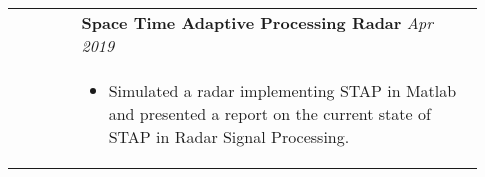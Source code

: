 \documentclass[letterpaper, 10pt, oneside]{article}
\newcommand{\stitle}[1]{\normalsize{\textsc{#1}}}
\newcommand{\bdit}[1]{{\textbf{#1}}}
\begin{document}
\begin{longtable}{@{} p{0.13\linewidth} p{0.8\linewidth}}
                         & \bdit{Space Time Adaptive Processing Radar} \hfill \textsl{Apr 2019}                                                                                                            \\
                         & \parbox{0.8\textwidth}{                                                                                                                                                         %
        \begin{itemize}[leftmargin=*, itemsep=-0.88ex, topsep=0.2ex]
            \item Simulated a radar implementing STAP in Matlab and presented a report on the current state of STAP in Radar Signal Processing.
        \end{itemize}
    }                                                                                                                                                                                                      \\
    \\[-1ex]





\end{longtable}
\end{document}
